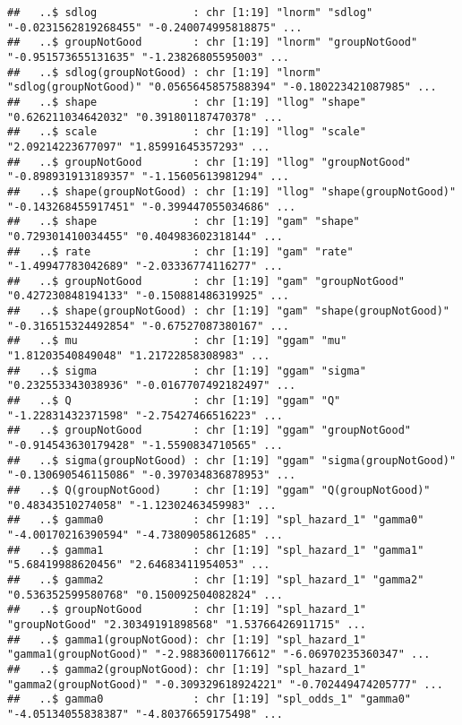 \documentclass[
]{article}
\begin{document}
\begin{verbatim}
##   ..$ sdlog               : chr [1:19] "lnorm" "sdlog" "-0.0231562819268455" "-0.240074995818875" ...
##   ..$ groupNotGood        : chr [1:19] "lnorm" "groupNotGood" "-0.951573655131635" "-1.23826805595003" ...
##   ..$ sdlog(groupNotGood) : chr [1:19] "lnorm" "sdlog(groupNotGood)" "0.0565645857588394" "-0.180223421087985" ...
##   ..$ shape               : chr [1:19] "llog" "shape" "0.626211034642032" "0.391801187470378" ...
##   ..$ scale               : chr [1:19] "llog" "scale" "2.09214223677097" "1.85991645357293" ...
##   ..$ groupNotGood        : chr [1:19] "llog" "groupNotGood" "-0.898931913189357" "-1.15605613981294" ...
##   ..$ shape(groupNotGood) : chr [1:19] "llog" "shape(groupNotGood)" "-0.143268455917451" "-0.399447055034686" ...
##   ..$ shape               : chr [1:19] "gam" "shape" "0.729301410034455" "0.404983602318144" ...
##   ..$ rate                : chr [1:19] "gam" "rate" "-1.49947783042689" "-2.03336774116277" ...
##   ..$ groupNotGood        : chr [1:19] "gam" "groupNotGood" "0.427230848194133" "-0.150881486319925" ...
##   ..$ shape(groupNotGood) : chr [1:19] "gam" "shape(groupNotGood)" "-0.316515324492854" "-0.67527087380167" ...
##   ..$ mu                  : chr [1:19] "ggam" "mu" "1.81203540849048" "1.21722858308983" ...
##   ..$ sigma               : chr [1:19] "ggam" "sigma" "0.232553343038936" "-0.0167707492182497" ...
##   ..$ Q                   : chr [1:19] "ggam" "Q" "-1.22831432371598" "-2.75427466516223" ...
##   ..$ groupNotGood        : chr [1:19] "ggam" "groupNotGood" "-0.914543630179428" "-1.5590834710565" ...
##   ..$ sigma(groupNotGood) : chr [1:19] "ggam" "sigma(groupNotGood)" "-0.130690546115086" "-0.397034836878953" ...
##   ..$ Q(groupNotGood)     : chr [1:19] "ggam" "Q(groupNotGood)" "0.48343510274058" "-1.12302463459983" ...
##   ..$ gamma0              : chr [1:19] "spl_hazard_1" "gamma0" "-4.00170216390594" "-4.73809058612685" ...
##   ..$ gamma1              : chr [1:19] "spl_hazard_1" "gamma1" "5.68419988620456" "2.64683411954053" ...
##   ..$ gamma2              : chr [1:19] "spl_hazard_1" "gamma2" "0.536352599580768" "0.150092504082824" ...
##   ..$ groupNotGood        : chr [1:19] "spl_hazard_1" "groupNotGood" "2.30349191898568" "1.53766426911715" ...
##   ..$ gamma1(groupNotGood): chr [1:19] "spl_hazard_1" "gamma1(groupNotGood)" "-2.98836001176612" "-6.06970235360347" ...
##   ..$ gamma2(groupNotGood): chr [1:19] "spl_hazard_1" "gamma2(groupNotGood)" "-0.309329618924221" "-0.702449474205777" ...
##   ..$ gamma0              : chr [1:19] "spl_odds_1" "gamma0" "-4.05134055838387" "-4.80376659175498" ...

\end{verbatim}
\end{document}
